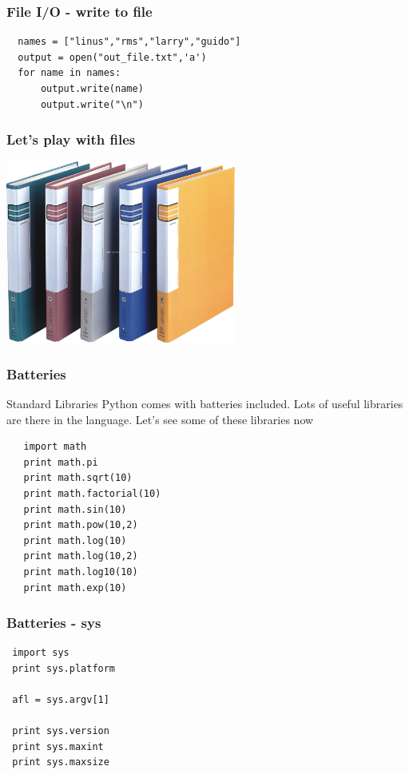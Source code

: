 \documentclass{beamer}
\begin{document}
\begin{frame}[fragile]
 \frametitle{File I/O - write to file}
  \begin{verbatim}
  names = ["linus","rms","larry","guido"]
  output = open("out_file.txt",'a')
  for name in names:
      output.write(name)
      output.write("\n")

  \end{verbatim}

\end{frame}

\begin{frame}
 \frametitle{Let's play with files}
\begin{center}
 \includegraphics[height=6cm]{file.jpg}
\end{center}

\end{frame}


\begin{frame}[fragile]
 \frametitle{Batteries}
  \begin{block}{Standard Libraries}
   Python comes with batteries included. Lots of useful libraries are there in the language. Let's see some of these libraries now
  \end{block}

  \begin{verbatim}
   import math
   print math.pi
   print math.sqrt(10)
   print math.factorial(10)
   print math.sin(10)
   print math.pow(10,2)
   print math.log(10)
   print math.log(10,2)
   print math.log10(10)
   print math.exp(10)
  \end{verbatim}

\end{frame}

\begin{frame}[fragile]
 \frametitle{Batteries - sys}
\begin{verbatim}
 import sys
 print sys.platform
 
 afl = sys.argv[1]

 print sys.version
 print sys.maxint
 print sys.maxsize
\end{verbatim}

\end{frame}
\end{document}
